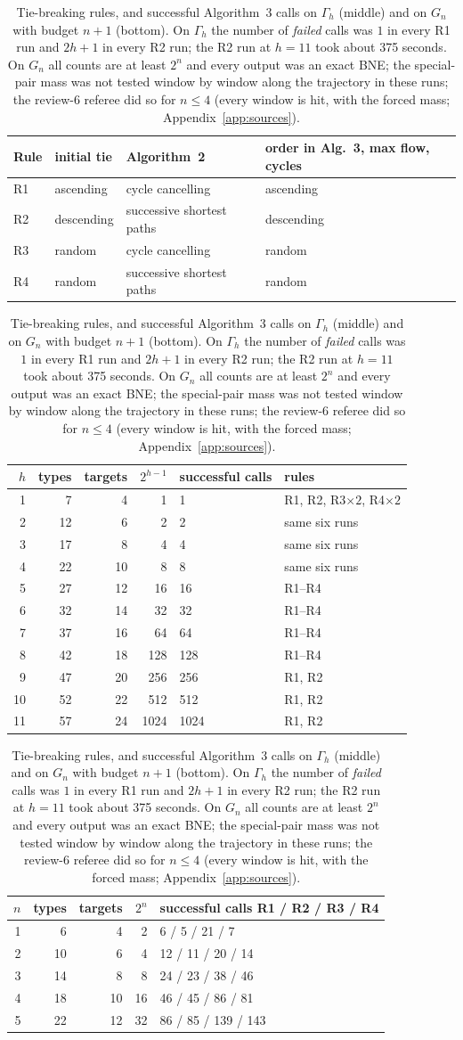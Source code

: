 \begin{table}[h]
\centering\small
\begin{tabular}{llll}
\toprule
Rule & initial tie & Algorithm~2 & order in Alg.~3, max flow, cycles\\
\midrule
R1 & ascending & cycle cancelling & ascending\\
R2 & descending & successive shortest paths & descending\\
R3 & random & cycle cancelling & random\\
R4 & random & successive shortest paths & random\\
\bottomrule
\end{tabular}

\bigskip
\begin{tabular}{rrrrll}
\toprule
$h$ & types & targets & $2^{h-1}$ & successful calls & rules\\
\midrule
1 & 7 & 4 & 1 & 1 & R1, R2, R3$\times2$, R4$\times2$\\
2 & 12 & 6 & 2 & 2 & same six runs\\
3 & 17 & 8 & 4 & 4 & same six runs\\
4 & 22 & 10 & 8 & 8 & same six runs\\
5 & 27 & 12 & 16 & 16 & R1--R4\\
6 & 32 & 14 & 32 & 32 & R1--R4\\
7 & 37 & 16 & 64 & 64 & R1--R4\\
8 & 42 & 18 & 128 & 128 & R1--R4\\
9 & 47 & 20 & 256 & 256 & R1, R2\\
10 & 52 & 22 & 512 & 512 & R1, R2\\
11 & 57 & 24 & 1024 & 1024 & R1, R2\\
\bottomrule
\end{tabular}

\bigskip
\begin{tabular}{rrrrl}
\toprule
$n$ & types & targets & $2^n$ & successful calls R1 / R2 / R3 / R4\\
\midrule
1 & 6 & 4 & 2 & 6 / 5 / 21 / 7\\
2 & 10 & 6 & 4 & 12 / 11 / 20 / 14\\
3 & 14 & 8 & 8 & 24 / 23 / 38 / 46\\
4 & 18 & 10 & 16 & 46 / 45 / 86 / 81\\
5 & 22 & 12 & 32 & 86 / 85 / 139 / 143\\
\bottomrule
\end{tabular}
\caption{Tie-breaking rules, and successful Algorithm~3 calls on $\Gamma_h$ (middle) and on $G_n$ with
budget $n+1$ (bottom). On $\Gamma_h$ the number of \emph{failed} calls was $1$ in every R1 run and $2h+1$
in every R2 run; the R2 run at $h=11$ took about 375 seconds. On $G_n$ all counts are at least $2^n$ and
every output was an exact BNE; the special-pair mass was not tested window by window along the
trajectory in these runs; the review-6 referee did so for $n\le4$ (every window is hit, with the forced mass; Appendix~\ref{app:sources}).}
\label{tab:lck-runs}
\end{table}

